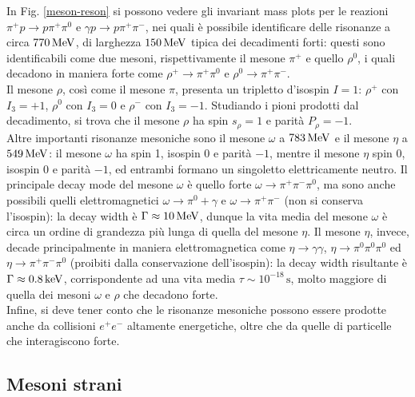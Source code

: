 In Fig. \ref{meson-reson} si possono vedere gli invariant mass plots per le reazioni $ \pi^+ p \rightarrow p \pi^+ \pi^0 $ e $ \gamma p \rightarrow p \pi^+ \pi^- $, nei quali è possibile identificare delle risonanze a circa $ 770\,\mathrm{MeV} $, di larghezza $ 150\,\mathrm{MeV} $ tipica dei decadimenti forti: questi sono identificabili come due mesoni, rispettivamente il mesone $ \pi^+ $ e quello $ \rho^0 $, i quali decadono in maniera forte come $ \rho^+ \rightarrow \pi^+ \pi^0 $ e $ \rho^0 \rightarrow \pi^+ \pi^- $.\\
Il mesone $ \rho $, così come il mesone $ \pi $, presenta un tripletto d'isospin $ I = 1 $: $ \rho^+ $ con $ I_3 = +1 $, $ \rho^0 $ con $ I_3 = 0 $ e $ \rho^- $ con $ I_3 = -1 $. Studiando i pioni prodotti dal decadimento, si trova che il mesone $ \rho $ ha spin $ s_{\rho} = 1 $ e parità $ P_{\rho} = -1 $.\\
Altre importanti risonanze mesoniche sono il mesone $ \omega $ a $ 783\,\mathrm{MeV} $ e il mesone $ \eta $ a $ 549\,\mathrm{MeV} $: il mesone $ \omega $ ha spin 1, isospin 0 e parità $ -1 $, mentre il mesone $ \eta $ spin 0, isospin 0 e parità $ -1 $, ed entrambi formano un singoletto elettricamente neutro. Il principale decay mode del mesone $ \omega $ è quello forte $ \omega \rightarrow \pi^+ \pi^- \pi^0 $, ma sono anche possibili quelli elettromagnetici $ \omega \rightarrow \pi^0 + \gamma $ e $ \omega \rightarrow \pi^+ \pi^- $ (non si conserva l'isospin): la decay width è $ \Gamma \approx 10\,\mathrm{MeV} $, dunque la vita media del mesone $ \omega $ è circa un ordine di grandezza più lunga di quella del mesone $ \eta $. Il mesone $ \eta $, invece, decade principalmente in maniera elettromagnetica come $ \eta \rightarrow \gamma \gamma $, $ \eta \rightarrow \pi^0 \pi^0 \pi^0 $ ed $ \eta \rightarrow \pi^+ \pi^- \pi^0 $ (proibiti dalla conservazione dell'isospin): la decay width risultante è $ \Gamma \approx 0.8\,\mathrm{keV} $, corrispondente ad una vita media $ \tau \sim 10^{-18} \,\text{s} $, molto maggiore di quella dei mesoni $ \omega $ e $ \rho $ che decadono forte.\\
Infine, si deve tener conto che le risonanze mesoniche possono essere prodotte anche da collisioni $ e^+ e^- $ altamente energetiche, oltre che da quelle di particelle che interagiscono forte.

\subsection{Mesoni strani}

